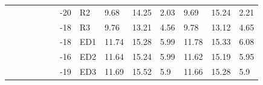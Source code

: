 {\begin{minipage}{\linewidth}
\begin{tabular}{l|l|l|l|c|c|r|l|lll|lll}
                                              &                                          &                                           &                                           & \multicolumn{1}{l|}{}                      &                                                                                         & -20                                                                                            & R2                                        & 9.68  & 14.25 & 2.03      & 9.69  & 15.24 & 2.21       \\
                                              &                                          &                                           &                                           & \multicolumn{1}{l|}{}                      &                                                                                         & -18                                                                                            & R3                                        & 9.76  & 13.21 & 4.56      & 9.78  & 13.12 & 4.65       \\
                                              &                                          &                                           &                                           & \multicolumn{1}{l|}{}                      &                                                                                         & -18                                                                                            & ED1                                       & 11.74 & 15.28 & 5.99      & 11.78 & 15.33 & 6.08       \\
                                              &                                          &                                           &                                           & \multicolumn{1}{l|}{}                      &                                                                                         & -16                                                                                            & ED2                                       & 11.64 & 15.24 & 5.99      & 11.62 & 15.19 & 5.95       \\
                                              &                                          &                                           &                                           & \multicolumn{1}{l|}{}                      &                                                                                         & -19                                                                                            & ED3                                       & 11.69 & 15.52 & 5.9       & 11.66 & 15.28 & 5.9        \\
  \hline\hline
  \end{tabular}
  \end{minipage}
}


